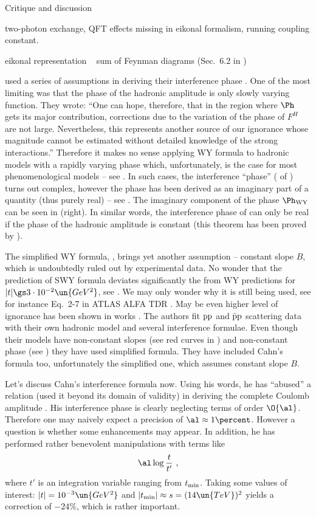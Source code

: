 \caption{Critique and discussion}

\> two-photon exchange, QFT effects missing in eikonal formalism, running coupling constant.

\> eikonal representation ~ sum of Feynman diagrams (Sec.~6.2 in )

\WaY{} used a series of assumptions in deriving their interference phase . One of the most limiting was that the phase of the hadronic amplitude is only slowly varying function. They wrote: ``One can hope, therefore, that in the region where $\Ph$ gets its major contribution, corrections due to the variation of the phase of $F^H$ are not large. Nevertheless, this represents another source of our ignorance whose magnitude cannot be estimated without detailed knowledge of the strong interactions.'' Therefore it makes no sense applying WY formula to hadronic models with a rapidly varying phase which, unfortunately, is the case for most phenomenological models -- see . In such cases, the interference ``phase'' (\rhs{} of ) turns out complex, however the phase has been derived as an imaginary part of a quantity (thus purely real) -- see . The imaginary component of the phase $\Ph_{\rm WY}$ can be seen in  (right). In similar words, the interference phase of \WaY{} can only be real if the phase of the hadronic amplitude is constant (this theorem has been proved by ).

The simplified WY formula, , brings yet another assumption -- constant slope $B$, which is undoubtedly ruled out by experimental data.
No wonder that the prediction of SWY formula deviates significantly the from WY predictions for $|t| \gs 3\cdot 10^{-2}\un{GeV^2}$, see . We may only wonder why it is still being used, see for instance Eq.~2-7 in ATLAS ALFA TDR . May be even higher level of ignorance has been shown in works . The authors fit $\rm pp$ and $\rm\bar pp$ scattering data with their own hadronic model and several interference formulae. Even though their models have non-constant slopes (see red curves in ) and non-constant phase (see ) they have used simplified \WY{} formula. They have included Cahn's formula too, unfortunately the simplified one, which assumes constant slope $B$.

Let's discuss Cahn's interference formula  now. Using his words, he has ``abused'' a relation (used it beyond its domain of validity) in deriving the complete Coulomb amplitude . His interference phase is clearly neglecting terms of order $\O{\al}$. Therefore one may naively expect a precision of $\al\approx 1\percent$. However a question is whether some enhancements may appear. In addition, he has performed rather benevolent manipulations with terms like
$$\al \log {t\over t'}\ ,$$
where $t'$ is an integration variable ranging from $t_{\rm min}$. Taking some values of interest: $|t| = 10^{-3}\un{GeV^2}$ and $|t_{\rm min}| \approx s = (14\un{TeV})^2$ yields a correction of $-24\percent$, which is rather important.

